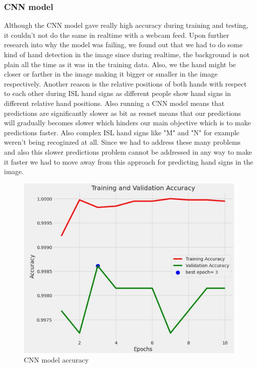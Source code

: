 \documentclass[12pt,a4paper]{report}
\begin{document}
\subsubsection{CNN model}
Although the CNN model gave really high accuracy during training and testing, it couldn't not do the same in realtime with a webcam feed. Upon further research into why the model was failing, we found out that we had to do some kind of hand detection in the image since during realtime, the background is not plain all the time as it was in the training data. Also, we the hand might be closer or farther in the image making it bigger or smaller in the image respectively. Another reason is the relative positions of both hands with respect to each other during ISL hand signs as different people show hand signs in different relative hand positions. Also running a CNN model means that predictions are significantly slower as bit as resnet means that our predictions will gradually becomes slower which hinders our main objective which is to make predictions faster. Also complex ISL hand signs like "M" and "N" for example weren't being recoginzed at all. Since we had to address these many problems and also this slower predictions problem cannot be addressed in any way to make it faster we had to move away from this approach for predicting hand signs in the image.
\begin{figure}[htbp]
	\centerline{\includegraphics[scale=0.5]{cnn_accuracy.jpg}}
	\caption{CNN model accuracy}
	\label{Cnn_accuracy}
\end{figure}
\end{document}
